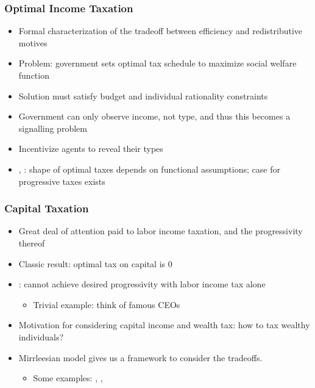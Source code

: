 \documentclass{beamer}
\begin{document}
\begin{frame}
    \frametitle{Optimal Income Taxation}
    
    \cite{mirrlees1971exploration}
    \begin{itemize}
        \item Formal characterization of the tradeoff between efficiency and redistributive motives
        \item Problem: government sets optimal tax schedule to maximize social welfare function
        \item Solution must satisfy budget and individual rationality constraints
        \item Government can only observe income, not type, and thus this becomes a signalling problem
        \item Incentivize agents to reveal their types 
        \item \cite{diamond1998optimal}, \cite{saez2001using}: shape of optimal taxes depends on functional assumptions; case for progressive taxes exists
    \end{itemize}

\end{frame}


\begin{frame}
    \frametitle{Capital Taxation}

    \begin{itemize}
        \item Great deal of attention paid to labor income taxation, and the progressivity thereof
        \item Classic result: optimal tax on capital is 0
        \item \cite{saez2019triumph}: cannot achieve desired progressivity with labor income tax alone
        \begin{itemize}
            \item Trivial example: think of famous CEOs %
        \end{itemize}
        \item Motivation for considering capital income and wealth tax: how to tax wealthy individuals?
        \item Mirrleesian model gives us a framework to consider the tradeoffs. 
        \begin{itemize}
            \item Some examples: \cite{golosov2003optimal}, \cite{albanesi2006dynamic}, \cite{golosov2006new}
        \end{itemize}
    \end{itemize}

\end{frame}
\end{document}
